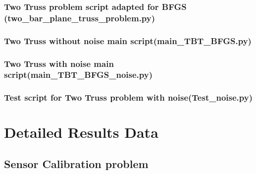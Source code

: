 \subsubsection{Two Truss problem script adapted for BFGS (two\_bar\_plane\_truss\_problem.py)}


\subsubsection{Two Truss without noise main script(main\_TBT\_BFGS.py)}


\subsubsection{Two Truss with noise main script(main\_TBT\_BFGS\_noise.py)}


\subsubsection{Test script for Two Truss problem with noise(Test\_noise.py)}


\section{Detailed Results Data}

\subsection{Sensor Calibration problem}
